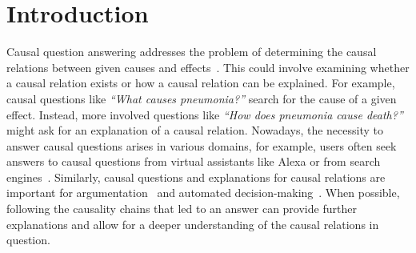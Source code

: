 %
\chapter{Introduction}
\label{sec:intro}

Causal question answering addresses the problem of determining the causal relations between given causes and effects~\cite{KayeshCausalTransfer2020, DalalCausalQAEnhancing2021}. This could involve examining whether a causal relation exists or how a causal relation can be explained.
For example, causal questions like \textit{``What causes pneumonia?''} search for the cause of a given effect.
Instead, more involved questions like \textit{``How does pneumonia cause death?''} might ask for an explanation of a causal relation. 
Nowadays, the necessity to answer causal questions arises in various domains, for example, users often seek answers to causal questions from virtual assistants like Alexa or from search engines~\cite{Nguyen2016MSMARCO, Heindorf2020Causenet}. Similarly, causal questions and explanations for causal relations are important for argumentation~\cite{Walton2007Dialog, Habernal2018Argumentation} and automated decision-making~\cite{HassanzadeshCausalQA2019, KayeshCausalTransfer2020, Heindorf2020Causenet}.
When possible, following the causality chains that led to an answer 
can provide further explanations and allow for a deeper understanding of the causal relations in question.




